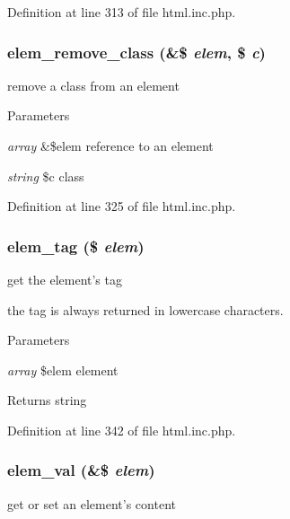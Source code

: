 Definition at line 313 of file html.inc.php.

\hypertarget{html_8inc_8php_a6a224914e8f32176ca11a31154b1ae13}{
\subsubsection[{elem\_\-remove\_\-class}]{\setlength{\rightskip}{0pt plus 5cm}elem\_\-remove\_\-class (\&\$ {\em elem}, \/  \$ {\em c})}}
\label{html_8inc_8php_a6a224914e8f32176ca11a31154b1ae13}
remove a class from an element


\begin{DoxyParams}{Parameters}
\item[{\em array}]\&\$elem reference to an element \item[{\em string}]\$c class \end{DoxyParams}


Definition at line 325 of file html.inc.php.

\hypertarget{html_8inc_8php_a158c5e6dccf734bc8c035e6bcd0a446f}{
\subsubsection[{elem\_\-tag}]{\setlength{\rightskip}{0pt plus 5cm}elem\_\-tag (\$ {\em elem})}}
\label{html_8inc_8php_a158c5e6dccf734bc8c035e6bcd0a446f}
get the element's tag

the tag is always returned in lowercase characters. 
\begin{DoxyParams}{Parameters}
\item[{\em array}]\$elem element \end{DoxyParams}
\begin{DoxyReturn}{Returns}
string 
\end{DoxyReturn}


Definition at line 342 of file html.inc.php.

\hypertarget{html_8inc_8php_ae28d850c3c906c6884462ca89c06f59b}{
\subsubsection[{elem\_\-val}]{\setlength{\rightskip}{0pt plus 5cm}elem\_\-val (\&\$ {\em elem})}}
\label{html_8inc_8php_ae28d850c3c906c6884462ca89c06f59b}
get or set an element's content


